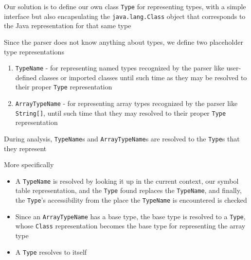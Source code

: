 \documentclass[8pt,a4paper,compress]{beamer}
\begin{document}
\begin{frame}[fragile]
\pause

Our solution is to define our own class \lstinline{Type} for representing types, with a simple interface but also encapsulating the \lstinline{java.lang.Class} object that corresponds to the Java representation for that same type

\pause
\bigskip

Since the parser does not know anything about types, we define two placeholder type representations
\begin{enumerate}
\pause
\item \lstinline{TypeName} - for representing named types recognized by the parser like user-defined classes or imported classes until such time as they may be resolved to their proper \lstinline{Type} representation
\pause
\item \lstinline{ArrayTypeName} - for representing array types recognized by the parser like \lstinline{String[]}, until such time that they may resolved to their proper \lstinline{Type} representation
\end{enumerate}

\pause
\bigskip

During analysis, \lstinline{TypeName}s and \lstinline{ArrayTypeName}s are resolved to the \lstinline{Type}s that they represent

\pause
\bigskip

More specifically
\begin{itemize}
\pause
\item A \lstinline{TypeName} is resolved by looking it up in the current context, our symbol table representation, and the \lstinline{Type} found replaces the \lstinline{TypeName}, and finally, the \lstinline{Type}'s accessibility from the place the \lstinline{TypeName} is encountered is checked
\pause
\item Since an \lstinline{ArrayTypeName} has a base type, the base type is resolved to a \lstinline{Type}, whose \lstinline{Class} representation becomes the base type for representing the array type
\pause
\item A \lstinline{Type} resolves to itself
\end{itemize}
\end{frame}
\end{document}
